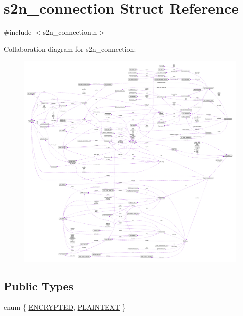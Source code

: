 \hypertarget{structs2n__connection}{}\section{s2n\+\_\+connection Struct Reference}
\label{structs2n__connection}


{\ttfamily \#include $<$s2n\+\_\+connection.\+h$>$}



Collaboration diagram for s2n\+\_\+connection\+:\nopagebreak
\begin{figure}[H]
\begin{center}
\leavevmode
\includegraphics[width=350pt]{structs2n__connection__coll__graph}
\end{center}
\end{figure}
\subsection*{Public Types}
\begin{DoxyCompactItemize}
\item 
enum \{ \hyperlink{structs2n__connection_abe974f22edeef8189603ba75fd90ff3caaac875c4dc08055725dd966fd44e0839}{E\+N\+C\+R\+Y\+P\+T\+ED}, 
\hyperlink{structs2n__connection_abe974f22edeef8189603ba75fd90ff3ca32dd92f4aa3e7642b89daf8fe17d852c}{P\+L\+A\+I\+N\+T\+E\+XT}
 \}
\end{DoxyCompactItemize}
